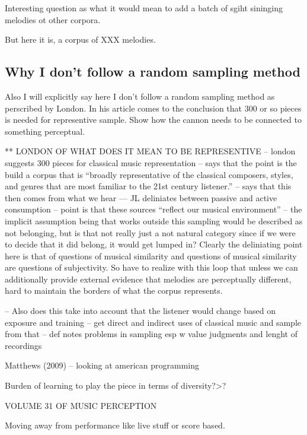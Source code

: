 \documentclass[]{book}
\begin{document}
Interesting question as what it would mean to add a batch of sgiht sininging melodies ot other corpora.

But here it is, a corpus of XXX melodies.

\hypertarget{why-i-dont-follow-a-random-sampling-method}{%
\subsection{Why I don't follow a random sampling method}\label{why-i-dont-follow-a-random-sampling-method}}

Also I will explicitly say here I don't follow a random sampling method as perscribed by London.
In his article comes to the conclusion that 300 or so pieces is needed for representive sample.
Show how the cannon needs to be connected to something perceptual.

** LONDON OF WHAT DOES IT MEAN TO BE REPRESENTIVE
-- london suggests 300 pieces for classical music representation
-- says that the point is the build a corpus that is ``broadly representative of the classical
composers, styles, and genres that are most familiar to the 21st century listener.''
-- says that this then comes from what we hear
--- JL deliniates between passive and active consumption
-- point is that these sources ``reflect our musical environment''
-- the implicit assumption being that works outside this sampling would be described as not belonging, but is that not really just a not natural category since if we were to decide that it did belong, it would get lumped in? Clearly the deliniating point here is that of questions of musical similarity and questions of musical similarity are questions of subjectivity. So have to realize with this loop that unless we can additionally provide external evidence that melodies are perceptually different, hard to maintain the borders of what the corpus represents.

-- Also does this take into account that the listener would change based on exposure and training
-- get direct and indirect uses of classical music and sample from that
-- def notes problems in sampling esp w value judgments and lenght of recordings

Matthews (2009) -- looking at american programming

Burden of learning to play the piece in terms of diversity?\textgreater{}?

VOLUME 31 OF MUSIC PERCEPTION

Moving away from performance like live stuff or score based.
\end{document}
